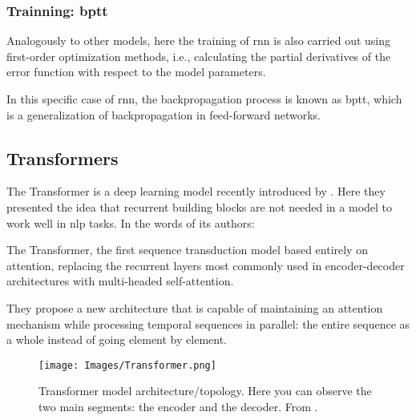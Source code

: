 \subsubsection{Trainning: \acl*{bptt}}

Analogously to other models, here the training of \gls{rnn} is also carried out
using first-order optimization methods, i.e., calculating the partial
derivatives of the error function with respect to the model parameters.

In this specific case of \gls{rnn}, the backpropagation process is known as
\gls{bptt}, which is a generalization of backpropagation in feed-forward
networks.


\subsection{Transformers}\label{sec:transformers}

The Transformer is a deep learning model recently introduced by
. Here they presented the idea that
recurrent building blocks are not needed in a model to work well in \gls{nlp}
tasks. In the words of its authors:

\begin{quoteBox}
  The Transformer, the first sequence transduction model based entirely
  on attention, replacing the recurrent layers most commonly used in
  encoder-decoder architectures with multi-headed self-attention.
  \tcblower{}
\end{quoteBox}

They propose a new architecture that is capable of maintaining an attention
mechanism while processing temporal sequences in parallel: the entire sequence
as a whole instead of going element by element.

\begin{figure}[p]
  \centering
  \texttt{[image: Images/Transformer.png]}
  \caption[Transformer model architecture]{Transformer model
    architecture/topology. Here you can observe the two main segments: the
    encoder and the decoder. From
    .}\label{fig:transformer}
\end{figure}

